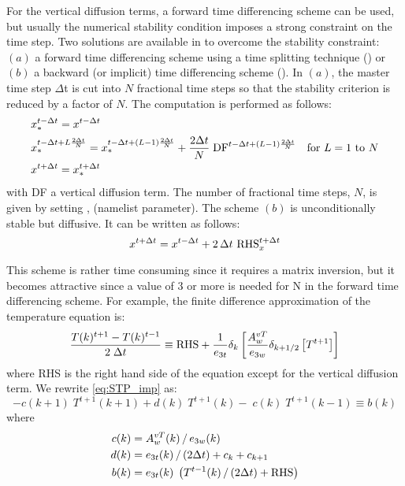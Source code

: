 \documentclass[../tex_main/NEMO_manual]{subfiles}
\begin{document}
For the vertical diffusion terms, a forward time differencing scheme can be used,
but usually the numerical stability condition imposes a strong constraint on the time step.
Two solutions are available in \NEMO to overcome the stability constraint:
$(a)$ a forward time differencing scheme using a time splitting technique () or
$(b)$ a backward (or implicit) time differencing scheme                   ().
In $(a)$, the master time step $\Delta $t is cut into $N$ fractional time steps so that
the stability criterion is reduced by a factor of $N$.
The computation is performed as follows:
\begin{equation} \label{eq:STP_ts}
\begin{split}
& x_\ast ^{t-\Delta t} = x^{t-\Delta t}   \\
& x_\ast ^{t-\Delta t+L\frac{2\Delta t}{N}}=x_\ast ^{t-\Delta t+\left( {L-1} 
\right)\frac{2\Delta t}{N}}+\frac{2\Delta t}{N}\;\text{DF}^{t-\Delta t+\left( {L-1} \right)\frac{2\Delta t}{N}}
        \quad \text{for $L=1$ to $N$}      \\
& x^{t+\Delta t} = x_\ast^{t+\Delta t}
\end{split}
\end{equation}
with DF a vertical diffusion term.
The number of fractional time steps, $N$, is given by setting , (namelist parameter).
The scheme $(b)$ is unconditionally stable but diffusive. It can be written as follows:
\begin{equation} \label{eq:STP_imp}
   x^{t+\Delta t} = x^{t-\Delta t} + 2 \, \Delta t \  \text{RHS}_x^{t+\Delta t}
\end{equation} 


This scheme is rather time consuming since it requires a matrix inversion,
but it becomes attractive since a value of 3 or more is needed for N in the forward time differencing scheme.
For example, the finite difference approximation of the temperature equation is:
\begin{equation} \label{eq:STP_imp_zdf}
\frac{T(k)^{t+1}-T(k)^{t-1}}{2\;\Delta t}\equiv \text{RHS}+\frac{1}{e_{3t} }\delta 
_k \left[ {\frac{A_w^{vT} }{e_{3w} }\delta_{k+1/2} \left[ {T^{t+1}} \right]} 
\right]
\end{equation}
where RHS is the right hand side of the equation except for the vertical diffusion term.
We rewrite \autoref{eq:STP_imp} as:
\begin{equation} \label{eq:STP_imp_mat}
-c(k+1)\;T^{t+1}(k+1) + d(k)\;T^{t+1}(k) - \;c(k)\;T^{t+1}(k-1) \equiv b(k)
\end{equation}
where 
\begin{align*} 
 c(k) &= A_w^{vT} (k) \, / \, e_{3w} (k)     \\
 d(k) &= e_{3t} (k)       \, / \, (2\Delta t) + c_k + c_{k+1}    \\
 b(k) &= e_{3t} (k) \; \left( T^{t-1}(k) \, / \, (2\Delta t) + \text{RHS} \right)    
\end{align*}
\end{document}
